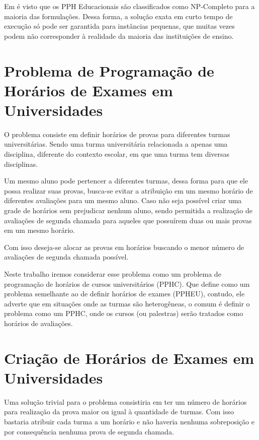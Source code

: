 Em  é visto que os PPH Educacionais são classificados como NP-Completo para a maioria das formulações. Dessa forma, a solução exata em curto tempo de execução só pode ser garantida para instâncias pequenas, que muitas vezes podem não corresponder à realidade da maioria das instituições de ensino.

\section{Problema de Programação de Horários de Exames em Universidades}
\label{subsec:desc_prob}
O problema consiste em definir horários de provas para diferentes turmas universitárias. Sendo uma turma universitária relacionada a apenas uma disciplina, diferente do contexto escolar, em que uma turma tem diversas disciplinas.

Um mesmo aluno pode pertencer a diferentes turmas, dessa forma para que ele possa realizar suas provas, busca-se evitar a atribuição em um mesmo horário de diferentes avaliações para um mesmo aluno. Caso não seja possível criar uma grade de horários sem prejudicar nenhum aluno, sendo permitida a realização de avaliações de segunda chamada para aqueles que possuírem duas ou mais provas em um mesmo horário. 

Com isso deseja-se alocar as provas em horários buscando o menor número de avaliações de segunda chamada possível.

Neste trabalho iremos considerar esse problema como um problema de programação de horários de cursos universitários (PPHC). Que  define como um problema semelhante ao de definir horários de exames (PPHEU), contudo, ele adverte que em situações onde as turmas são heterogêneas, o comum é definir o problema como um PPHC, onde os cursos (ou palestras) serão tratados como horários de avaliações.

\section{Criação de Horários de Exames em Universidades}

Uma solução trivial para o problema consistiria em ter um número de horários para realização da prova maior ou igual à quantidade de turmas. Com isso bastaria atribuir cada turma a um horário e não haveria nenhuma sobreposição e por consequência nenhuma prova de segunda chamada.

